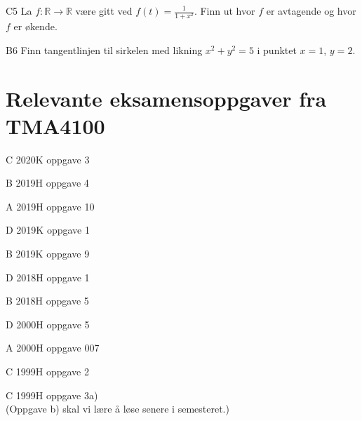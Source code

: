 \documentclass[a4paper,norsk,11pt]{interaktiv}
\begin{document}
\begin{oppgave}{C5}
La $f: \mathbb{R} \to \mathbb{R}$ være gitt ved $f(t)=\frac{1}{1+x^2}$.  Finn ut hvor $f$ er avtagende og hvor $f$ er  økende.
\end{oppgave}


\begin{oppgave}{B6}
Finn tangentlinjen til sirkelen med likning $x^2+y^2=5$ i punktet $x=1$, $y=2$. 
\end{oppgave}


\section*{Relevante eksamensoppgaver fra TMA4100}

\begin{oppgave}{C}
2020K oppgave 3
\end{oppgave}

\begin{oppgave}{B}
2019H oppgave 4
\end{oppgave}

\begin{oppgave}{A}
2019H oppgave 10
\end{oppgave}

\begin{oppgave}{D}
2019K oppgave 1
\end{oppgave}

\begin{oppgave}{B}
2019K oppgave 9
\end{oppgave}

\begin{oppgave}{D}
2018H oppgave 1
\end{oppgave}

\begin{oppgave}{B}
2018H oppgave 5
\end{oppgave}


\begin{oppgave}{D}
2000H oppgave 5
\end{oppgave}

\begin{oppgave}{A}
2000H oppgave 007
\end{oppgave}

\begin{oppgave}{C}
1999H oppgave 2
\end{oppgave}

\begin{oppgave}{C}
1999H oppgave 3a) \\
(Oppgave b) skal vi lære å løse senere i semesteret.)
\end{oppgave}

\end{document}
